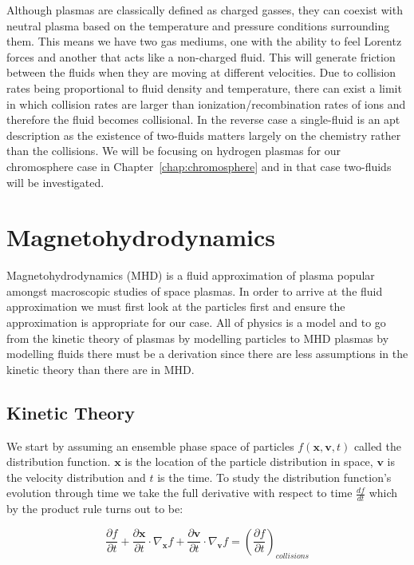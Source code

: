 \documentclass[12pt,upcase]{umlthesis}
\begin{document}
Although plasmas are classically defined as charged gasses, they can coexist with neutral plasma based on the temperature and pressure conditions surrounding them. This means we have two gas mediums, one with the ability to feel Lorentz forces and another that acts like a non-charged fluid. This will generate friction between the fluids when they are moving at different velocities. Due to collision rates being proportional to fluid density and temperature, there can exist a limit in which collision rates are larger than ionization/recombination rates of ions and therefore the fluid becomes collisional. In the reverse case a single-fluid is an apt description as the existence of two-fluids matters largely on the chemistry rather than the collisions. We will be focusing on hydrogen plasmas for our chromosphere case in Chapter~\ref{chap:chromosphere} and in that case two-fluids will be investigated.

\section{Magnetohydrodynamics}\label{sec:mhd}

Magnetohydrodynamics (MHD) is a fluid approximation of plasma popular amongst macroscopic studies of space plasmas. In order to arrive at the fluid approximation we must first look at the particles first and ensure the approximation is appropriate for our case. All of physics is a model and to go from the kinetic theory of plasmas by modelling particles to MHD plasmas by modelling fluids there must be a derivation since there are less assumptions in the kinetic theory than there are in MHD\@.

\subsection{Kinetic Theory}\label{sec:kinetictheory}

We start by assuming an ensemble phase space of particles $f(\textbf{x}, \textbf{v}, t)$ called the distribution function. $\textbf{x}$ is the location of the particle distribution in space, $\textbf{v}$ is the velocity distribution and $t$ is the time. To study the distribution function's evolution through time we take the full derivative with respect to time $\frac{df}{dt}$ which by the product rule turns out to be:

\begin{equation}
	\frac{\partial f}{\partial t} + \frac{\partial \textbf{x}}{\partial t} \cdot \nabla_{\textbf{x}} f + \frac{\partial \textbf{v}}{\partial t} \cdot \nabla_{\textbf{v}} f = {(\frac{\partial f}{\partial t})}_{collisions}
\end{equation}
\end{document}

